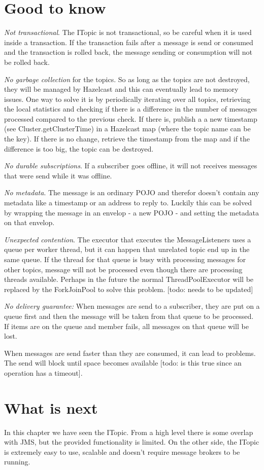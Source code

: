 \section{Good to know}

\emph{Not transactional}. The ITopic is not transactional, so be careful when it is used inside a transaction. If the transaction fails after a message is send or consumed and the transaction is rolled back, the message sending or consumption will not be rolled back.

\emph{No garbage collection} for the topics. So as long as the topics are not destroyed, they will be managed by Hazelcast and this can eventually lead to memory issues. One way to solve it is by periodically iterating over all topics, retrieving the local statistics and checking if there is a difference in the number of messages processed compared to the previous check. If there is, publish a a new timestamp (see Cluster.getClusterTime) in a Hazelcast map (where the topic name can be the key). If there is no change, retrieve the timestamp from the map and if the difference is too big, the topic can be destroyed.

\emph{No durable subscriptions}. If a subscriber goes offline, it will not receives messages that were send while it was offline.

\emph{No metadata}. The message is an ordinary POJO and therefor doesn't contain any metadata like a timestamp or an address to reply to. Luckily this can be solved by wrapping the message in an envelop - a new POJO - and setting the metadata on that envelop.

\emph{Unexpected contention}. The executor that executes the MessageListeners uses a queue per worker thread, but it can happen that unrelated topic end up in the same queue. If the thread for that queue is busy with processing messages for other topics, message will not be processed even though there are processing threads available. Perhaps in the future the normal ThreadPoolExecutor will be replaced by the ForkJoinPool to solve this problem. [todo: needs to be updated]

\emph{No delivery guarantee:} When messages are send to a subscriber, they are put on a queue first and then the message will be taken from that queue to be processed. If items are on the queue and member fails, all messages on that queue will be lost.

 When messages are send faster than they are consumed, it can lead to problems. The send will block until space becomes available [todo: is this true since an operation has a timeout]. 

\section{What is next}
In this chapter we have seen the ITopic. From a high level there is some overlap with JMS, but the provided functionality is limited. On the other side, the ITopic is extremely easy to use, scalable and doesn't require message brokers to be running.
